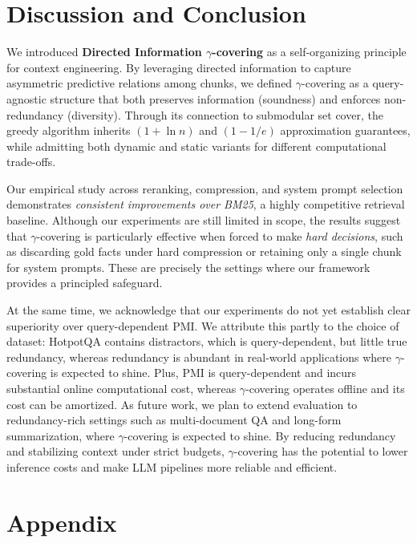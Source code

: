 \documentclass{article} %
\theoremstyle{definition}
\begin{document}
\section{Discussion and Conclusion}

We introduced \textbf{Directed Information $\gamma$-covering} as a self-organizing principle for context engineering. By leveraging directed information to capture asymmetric predictive relations among chunks, we defined $\gamma$-covering as a query-agnostic structure that both preserves information (soundness) and enforces non-redundancy (diversity). Through its connection to submodular set cover, the greedy algorithm inherits $(1+\ln n)$ and $(1-1/e)$ approximation guarantees, while admitting both dynamic and static variants for different computational trade-offs. 

Our empirical study across reranking, compression, and system prompt selection demonstrates \emph{consistent improvements over BM25}, a highly competitive retrieval baseline. Although our experiments are still limited in scope, the results suggest that $\gamma$-covering is particularly effective when forced to make \emph{hard decisions}, such as discarding gold facts under hard compression or retaining only a single chunk for system prompts. These are precisely the settings where our framework provides a principled safeguard. 

At the same time, we acknowledge that our experiments do not yet establish clear superiority over query-dependent PMI. We attribute this partly to the choice of dataset: HotpotQA contains distractors, which is query-dependent, but little true redundancy, whereas redundancy is abundant in real-world applications where $\gamma$-covering is expected to shine. Plus, PMI is query-dependent and incurs substantial online computational cost, whereas $\gamma$-covering operates offline and its cost can be amortized. As future work, we plan to extend evaluation to redundancy-rich settings such as multi-document QA and long-form summarization, where $\gamma$-covering is expected to shine. By reducing redundancy and stabilizing context under strict budgets, $\gamma$-covering has the potential to lower inference costs and make LLM pipelines more reliable and efficient.




\appendix
\section{Appendix}
\end{document}
